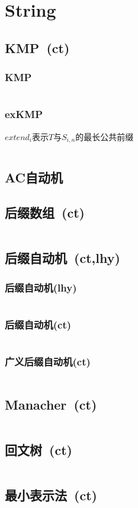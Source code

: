 \chapter{String}
\section{KMP\ \small(ct)}
	\subsection*{KMP}
		\inputminted{cpp}{String/kmp.cpp}
	\subsection*{exKMP}
		$ extend_i $表示$ T $与$ S_{i,n} $的最长公共前缀
		\inputminted{cpp}{String/ex_kmp.cpp}
\section{AC自动机}
\section{后缀数组\ \small(ct)}
	\inputminted{cpp}{String/suffix_array.cpp}
\section{后缀自动机\ \small(ct,lhy)}
	\subsection*{后缀自动机(lhy)}
		\inputminted{cpp}{String/suffix_automaton.cpp}
	\subsection*{后缀自动机(ct)}
		\inputminted{cpp}{String/suffix_automaton.cpp}
	\subsection*{广义后缀自动机(ct)}
		\inputminted{cpp}{String/general_suffix_automaton.cpp}
\section{Manacher\ \small(ct)}
	\inputminted{cpp}{String/manacher.cpp}
\section{回文树\ \small(ct)}
	\inputminted{cpp}{String/palindromic_tree.cpp}
\section{最小表示法\ \small(ct)}
	\inputminted{cpp}{String/minimal_rounding_string.cpp}